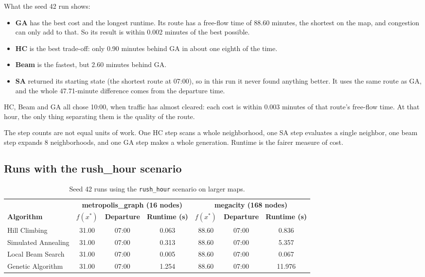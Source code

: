 \documentclass[11pt,a4paper]{article}
\newcommand{\col}[1]{\texttt{#1}}
\begin{document}
\noindent What the seed 42 run shows:
\begin{itemize}
  \item \textbf{GA} has the best cost and the longest runtime. Its route has a free-flow time of 88.60
  minutes, the shortest on the map, and congestion can only add to that. So its result is within 0.002
  minutes of the best possible.
  \item \textbf{HC} is the best trade-off: only 0.90 minutes behind GA in about one eighth of the time.
  \item \textbf{Beam} is the fastest, but 2.60 minutes behind GA.
  \item \textbf{SA} returned its starting state (the shortest route at 07:00), so in this run it never
  found anything better. It uses the same route as GA, and the whole 47.71-minute difference comes
  from the departure time.
\end{itemize}
HC, Beam and GA all chose 10:00, when traffic has almost cleared: each cost is within 0.003 minutes of
that route's free-flow time. At that hour, the only thing separating them is the quality of the route.

\noindent The step counts are not equal units of work. One HC step scans a whole neighborhood, one SA
step evaluates a single neighbor, one beam step expands 8 neighborhoods, and one GA step makes a
whole generation. Runtime is the fairer measure of cost.

\subsection{Runs with the rush\_hour scenario}

\begin{table}[H]
\centering
\caption{Seed 42 runs using the \col{rush\_hour} scenario on larger maps.}
\label{tab:rush}
\small
\setlength{\tabcolsep}{5pt}
\begin{tabular}{lcccccc}
\toprule
 & \multicolumn{3}{c}{\textbf{metropolis\_graph (16 nodes)}} & \multicolumn{3}{c}{\textbf{megacity (168 nodes)}} \\
\cmidrule(lr){2-4}\cmidrule(lr){5-7}
\textbf{Algorithm} & \textbf{$f(x^*)$} & \textbf{Departure} & \textbf{Runtime (s)} & \textbf{$f(x^*)$} & \textbf{Departure} & \textbf{Runtime (s)} \\
\midrule
Hill Climbing       & 31.00 & 07:00 & 0.063 & 88.60 & 07:00 & 0.836 \\
Simulated Annealing & 31.00 & 07:00 & 0.313 & 88.60 & 07:00 & 5.357 \\
Local Beam Search   & 31.00 & 07:00 & 0.005 & 88.60 & 07:00 & 0.067 \\
Genetic Algorithm   & 31.00 & 07:00 & 1.254 & 88.60 & 07:00 & 11.976 \\
\bottomrule
\end{tabular}
\end{table}
\end{document}
